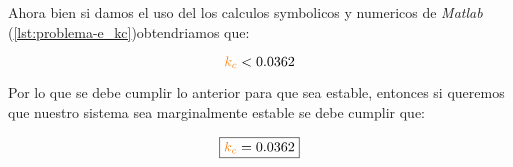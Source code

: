 Ahora bien si damos el uso del los calculos symbolicos y numericos de \textit{Matlab} (\autoref{lst:problema-e_kc})obtendriamos que: 

\begin{equation}
  \nara{k_c} < 0.0362
\end{equation}

Por lo que se debe cumplir lo anterior para que sea estable, entonces si queremos que nuestro sistema sea marginalmente estable se debe cumplir que:

\begin{equation}
  \boxed{\nara{k_c} = 0.0362}
\end{equation}



























